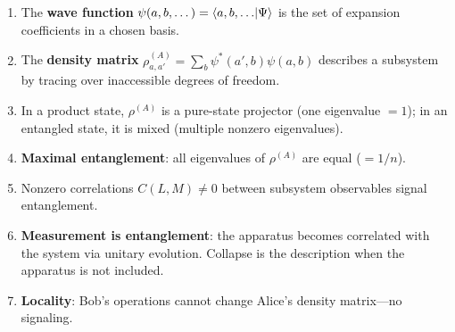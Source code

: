 \documentclass[12pt,a4paper]{article}
\begin{document}
\begin{enumerate}[nosep]
    \item The \textbf{wave function} $\psi(a,b,\dots)=\braket{a,b,\dots}{\Psi}$ is the set of expansion coefficients in a chosen basis.
    \item The \textbf{density matrix} $\rho^{(A)}_{a,a'}=\sum_b \psi^*(a',b)\psi(a,b)$ describes a subsystem by tracing over inaccessible degrees of freedom.
    \item In a product state, $\rho^{(A)}$ is a pure-state projector (one eigenvalue $=1$); in an entangled state, it is mixed (multiple nonzero eigenvalues).
    \item \textbf{Maximal entanglement}: all eigenvalues of $\rho^{(A)}$ are equal ($=1/n$).
    \item Nonzero correlations $C(L,M)\neq 0$ between subsystem observables signal entanglement.
    \item \textbf{Measurement is entanglement}: the apparatus becomes correlated with the system via unitary evolution.  Collapse is the description when the apparatus is not included.
    \item \textbf{Locality}: Bob's operations cannot change Alice's density matrix---no signaling.
\end{enumerate}
\end{document}
